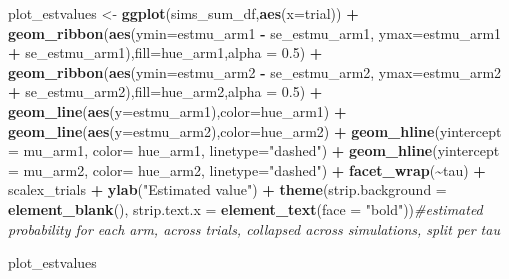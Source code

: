 \documentclass[
]{article}
\newenvironment{Shaded}{\begin{snugshade}}{\end{snugshade}}
\newcommand{\AttributeTok}[1]{\textcolor[rgb]{0.13,0.29,0.53}{#1}}
\newcommand{\CommentTok}[1]{\textcolor[rgb]{0.56,0.35,0.01}{\textit{#1}}}
\newcommand{\FloatTok}[1]{\textcolor[rgb]{0.00,0.00,0.81}{#1}}
\newcommand{\FunctionTok}[1]{\textcolor[rgb]{0.13,0.29,0.53}{\textbf{#1}}}
\newcommand{\NormalTok}[1]{#1}
\newcommand{\OtherTok}[1]{\textcolor[rgb]{0.56,0.35,0.01}{#1}}
\newcommand{\SpecialCharTok}[1]{\textcolor[rgb]{0.81,0.36,0.00}{\textbf{#1}}}
\newcommand{\StringTok}[1]{\textcolor[rgb]{0.31,0.60,0.02}{#1}}
\begin{document}
\begin{Shaded}
\begin{Highlighting}[]
\NormalTok{plot\_estvalues }\OtherTok{\textless{}{-}} \FunctionTok{ggplot}\NormalTok{(sims\_sum\_df,}\FunctionTok{aes}\NormalTok{(}\AttributeTok{x=}\NormalTok{trial)) }\SpecialCharTok{+} 
  \FunctionTok{geom\_ribbon}\NormalTok{(}\FunctionTok{aes}\NormalTok{(}\AttributeTok{ymin=}\NormalTok{estmu\_arm1 }\SpecialCharTok{{-}}\NormalTok{ se\_estmu\_arm1, }\AttributeTok{ymax=}\NormalTok{estmu\_arm1 }\SpecialCharTok{+}\NormalTok{ se\_estmu\_arm1),}\AttributeTok{fill=}\NormalTok{hue\_arm1,}\AttributeTok{alpha =} \FloatTok{0.5}\NormalTok{) }\SpecialCharTok{+} 
  \FunctionTok{geom\_ribbon}\NormalTok{(}\FunctionTok{aes}\NormalTok{(}\AttributeTok{ymin=}\NormalTok{estmu\_arm2 }\SpecialCharTok{{-}}\NormalTok{ se\_estmu\_arm2, }\AttributeTok{ymax=}\NormalTok{estmu\_arm2 }\SpecialCharTok{+}\NormalTok{ se\_estmu\_arm2),}\AttributeTok{fill=}\NormalTok{hue\_arm2,}\AttributeTok{alpha =} \FloatTok{0.5}\NormalTok{) }\SpecialCharTok{+} 
  \FunctionTok{geom\_line}\NormalTok{(}\FunctionTok{aes}\NormalTok{(}\AttributeTok{y=}\NormalTok{estmu\_arm1),}\AttributeTok{color=}\NormalTok{hue\_arm1) }\SpecialCharTok{+} 
  \FunctionTok{geom\_line}\NormalTok{(}\FunctionTok{aes}\NormalTok{(}\AttributeTok{y=}\NormalTok{estmu\_arm2),}\AttributeTok{color=}\NormalTok{hue\_arm2) }\SpecialCharTok{+} 
  \FunctionTok{geom\_hline}\NormalTok{(}\AttributeTok{yintercept =}\NormalTok{ mu\_arm1, }\AttributeTok{color=}\NormalTok{ hue\_arm1, }\AttributeTok{linetype=}\StringTok{"dashed"}\NormalTok{) }\SpecialCharTok{+} 
  \FunctionTok{geom\_hline}\NormalTok{(}\AttributeTok{yintercept =}\NormalTok{ mu\_arm2, }\AttributeTok{color=}\NormalTok{ hue\_arm2, }\AttributeTok{linetype=}\StringTok{"dashed"}\NormalTok{) }\SpecialCharTok{+} 
  \FunctionTok{facet\_wrap}\NormalTok{(}\SpecialCharTok{\textasciitilde{}}\NormalTok{tau) }\SpecialCharTok{+} 
\NormalTok{  scalex\_trials }\SpecialCharTok{+}
  \FunctionTok{ylab}\NormalTok{(}\StringTok{"Estimated value"}\NormalTok{) }\SpecialCharTok{+} 
  \FunctionTok{theme}\NormalTok{(}\AttributeTok{strip.background =} \FunctionTok{element\_blank}\NormalTok{(), }\AttributeTok{strip.text.x =} \FunctionTok{element\_text}\NormalTok{(}\AttributeTok{face =} \StringTok{"bold"}\NormalTok{))}\CommentTok{\#estimated probability for each arm, across trials, collapsed across simulations, split per tau}

\NormalTok{plot\_estvalues}
\end{Highlighting}
\end{Shaded}
\end{document}
